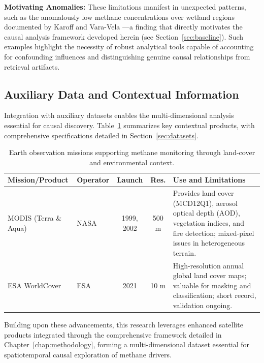 \textbf{Motivating Anomalies:} These limitations manifest in unexpected patterns, such as the anomalously low methane concentrations over wetland regions documented by Karoff and Vara-Vela \cite{Karoff2023}—a finding that directly motivates the causal analysis framework developed herein (see Section~\ref{sec:baseline}). Such examples highlight the necessity of robust analytical tools capable of accounting for confounding influences and distinguishing genuine causal relationships from retrieval artifacts.

\subsection{Auxiliary Data and Contextual Information}

Integration with auxiliary datasets enables the multi-dimensional analysis essential for causal discovery. Table~\ref{tab:contextual_products} summarizes key contextual products, with comprehensive specifications detailed in Section~\ref{sec:datasets}.

\begin{table}[htbp]
	\centering
	\caption[Earth observation missions supporting methane monitoring]{Earth observation missions supporting methane monitoring through land-cover and environmental context.}
	\label{tab:contextual_products}
	\small
	\begin{tabularx}{\textwidth}{@{}l l c c X@{}}
		\toprule
		\textbf{Mission/Product} & \textbf{Operator} & \textbf{Launch} & \textbf{Res.} & \textbf{Use and Limitations}                                                                                                                     \\
		\midrule
		MODIS (Terra \& Aqua)    & NASA              & 1999, 2002      & 500 m         & Provides land cover (MCD12Q1), aerosol optical depth (AOD), vegetation indices, and fire detection; mixed-pixel issues in heterogeneous terrain. \\
		ESA WorldCover           & ESA               & 2021            & 10 m          & High-resolution annual global land cover maps; valuable for masking and classification; short record, validation ongoing.                        \\
		\bottomrule
	\end{tabularx}
\end{table}

Building upon these advancements, this research leverages enhanced satellite products integrated through the comprehensive framework detailed in Chapter~\ref{chap:methodology}, forming a multi-dimensional dataset essential for spatiotemporal causal exploration of methane drivers.

